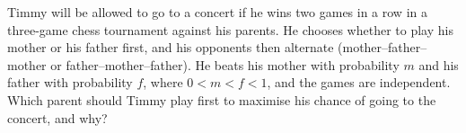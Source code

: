 Timmy will be allowed to go to a concert if he wins two games in a row in a three-game chess tournament against his parents. He chooses whether to play his mother or his father first, and his opponents then alternate (mother--father--mother or father--mother--father). He beats his mother with probability $m$ and his father with probability $f$, where $0<m<f<1$, and the games are independent. Which parent should Timmy play first to maximise his chance of going to the concert, and why?
